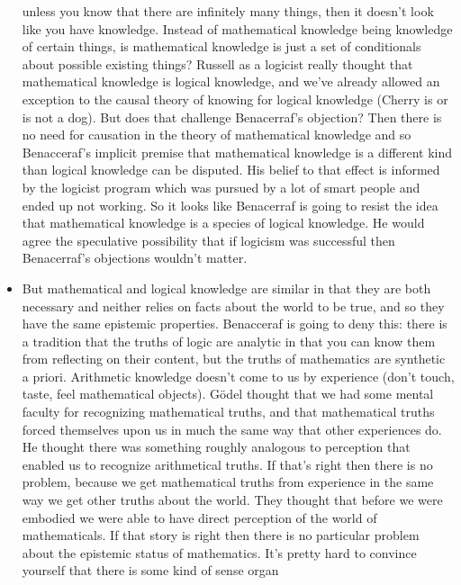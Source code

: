 \documentclass[12pt]{article}
\theoremstyle{definition}
\begin{document}
\begin{itemize}
        unless you know that there are infinitely many things, then it doesn't
        look like you have knowledge. Instead of mathematical knowledge being
        knowledge of certain things, is mathematical knowledge is just a set of
        conditionals about possible existing things? Russell as a logicist
        really thought that mathematical knowledge is logical knowledge, and
        we've already allowed an exception to the causal theory of knowing for
        logical knowledge (Cherry is or is not a dog). But does that challenge
        Benacerraf's objection? Then there is no need for causation in the
        theory of mathematical knowledge and so Benacceraf's implicit premise
        that mathematical knowledge is a different kind than logical knowledge
        can be disputed. His belief to that effect is informed by the logicist
        program which was pursued by a lot of smart people and ended up not
        working. So it looks like Benacerraf is going to resist the idea that
        mathematical knowledge is a species of logical knowledge. He would
        agree the speculative possibility that if logicism was successful then
        Benacerraf's objections wouldn't matter. 
    \item
        But mathematical and logical knowledge are similar in that they are
        both necessary and neither relies on facts about the world to be true,
        and so they have the same epistemic properties. Benacceraf is going to
        deny this: there is a tradition that the truths of logic are analytic
        in that you can know them from reflecting on their content, but the
        truths of mathematics are synthetic a priori. Arithmetic knowledge
        doesn't come to us by experience (don't touch, taste, feel mathematical
        objects). G\"odel thought that we had some mental faculty for
        recognizing mathematical truths, and that mathematical truths forced
        themselves upon us in much the same way that other experiences do. He
        thought there was something roughly analogous to perception that
        enabled us to recognize arithmetical truths. If that's right then there
        is no problem, because we get mathematical truths from experience in
        the same way we get other truths about the world. They thought that
        before we were embodied we were able to have direct perception of the
        world of mathematicals. If that story is right then there is no
        particular problem about the epistemic status of mathematics. It's
        pretty hard to convince yourself that there is some kind of sense organ

\end{itemize}
\end{document}
